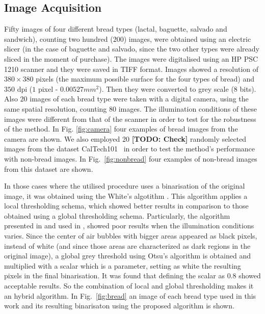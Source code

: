 \documentclass[oneside,a4paper,english,links]{amca}
\newcommand{\todo}[1]{\textbf{[TODO: #1]}}
\begin{document}
\subsection{Image Acquisition}
Fifty images of four different bread types (lactal, baguette, salvado and sandwich), counting two hundred ($200$) images, were obtained using an electric slicer (in the case of baguette and salvado, since the two other types were already sliced in the moment of purchase). The images were digitalised using an HP PSC 1210 scanner and they were saved in TIFF format. Images showed a resolution of $380 \times 380$ pixels (the maximum possible surface for the four types of bread) and $350$ dpi ($1$ pixel - $0.00527 mm^{2}$). Then they were converted to grey scale ($8$ bits). Also $20$ images of each bread type were taken with a digital camera, using the same spatial resolution, counting $80$ images. The illumination conditions of these images were different from that of the scanner in order to test for the robustness of the method. In Fig. \ref{fig:camera} four examples of bread images from the camera are shown. We also employed 20 \todo{Check} randomly selected images from the dataset CalTech101~\cite{FeiFei04} in order to test the method's performance with non-bread images. In Fig.~\ref{fig:nonbread} four examples of non-bread images from this dataset are shown. 

In those cases where the utilised procedure uses a binarisation of the original image, it was obtained using the White's algotithm \cite{White83}. This algorithm applies a local thresholding schema, which showed better results in comparison to those obtained using a global thresholding schema. Particularly, the algorithm presented in \cite{Huang95} and used in \cite{Gonzales2008}, showed poor results when the illumination conditions varies. Since the center of air bubbles with bigger areas appeared as black pixels, instead of white (and since those areas are characterized as dark regions in the original image), a global grey threshold using Otsu's algorithm \cite{Otsu79} is obtained and multiplied with a scalar which is a parameter, setting as white the resulting pixels in the final binarisation. It was found that defining the scalar as $0.8$ showed acceptable results. So the combination of local and global thresholding makes it an hybrid algorithm. In Fig.~\ref{fig:bread} an image of each bread type used in this work and its resulting binarisaton using the proposed algorithm is shown.  
\end{document}
